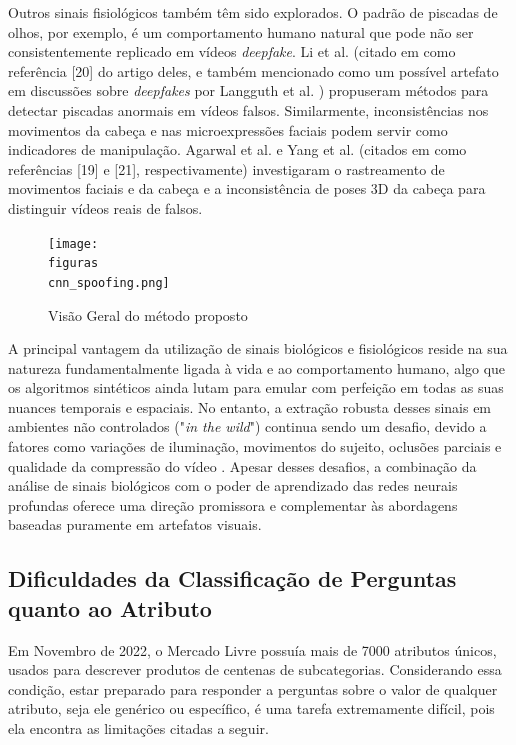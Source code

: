 Outros sinais fisiológicos também têm sido explorados. O padrão de piscadas de olhos, por exemplo, é um comportamento humano natural que pode não ser consistentemente replicado em vídeos \textit{deepfake}. Li et al. (citado em \cite{jin2021analise} como referência [20] do artigo deles, e também mencionado como um possível artefato em discussões sobre \textit{deepfakes} por Langguth et al. \cite{langguth2021dont}) propuseram métodos para detectar piscadas anormais em vídeos falsos. Similarmente, inconsistências nos movimentos da cabeça e nas microexpressões faciais podem servir como indicadores de manipulação. Agarwal et al. e Yang et al. (citados em \cite{jin2021analise} como referências [19] e [21], respectivamente) investigaram o rastreamento de movimentos faciais e da cabeça e a inconsistência de poses 3D da cabeça para distinguir vídeos reais de falsos.
\begin{figure}[htb]
        \centering
        \texttt{[image: \\figuras\\cnn\_spoofing.png]}
        \caption{Visão Geral do método proposto}
        \label{fig:aws_liveness}
\end{figure}

A principal vantagem da utilização de sinais biológicos e fisiológicos reside na sua natureza fundamentalmente ligada à vida e ao comportamento humano, algo que os algoritmos sintéticos ainda lutam para emular com perfeição em todas as suas nuances temporais e espaciais. No entanto, a extração robusta desses sinais em ambientes não controlados ("\textit{in the wild}") continua sendo um desafio, devido a fatores como variações de iluminação, movimentos do sujeito, oclusões parciais e qualidade da compressão do vídeo \cite{jin2021analise}. Apesar desses desafios, a combinação da análise de sinais biológicos com o poder de aprendizado das redes neurais profundas oferece uma direção promissora e complementar às abordagens baseadas puramente em artefatos visuais.


\subsection{Dificuldades da Classificação de Perguntas quanto ao Atributo}
\label{dificuldades da classificação de perguntas quanto ao atributo}
Em Novembro de 2022, o Mercado Livre possuía mais de 7000 atributos únicos, usados para descrever produtos de centenas de subcategorias. Considerando essa condição, estar preparado para responder a perguntas sobre o valor de qualquer atributo, seja ele genérico ou específico, é uma tarefa extremamente difícil, pois ela encontra as limitações citadas a seguir.

